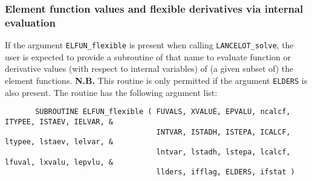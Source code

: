 \documentclass{galahad}
\newcommand{\fullpackagename}{LANC\-E\-LOT}
\newcommand{\solver}{{\tt \fullpackagename\_solve}}
\begin{document}

\subsubsection{Element function values and flexible derivatives via internal evaluation\label{efvf}}

If the argument {\tt ELFUN\_flexible} is present when calling \solver, the
user is expected to provide a subroutine of that name to evaluate
function or derivative values (with respect to internal variables)
of (a given subset of) the element functions.
{\bf N.B.} This routine is only permitted if the argument {\tt ELDERS}
is also present.
The routine has the following argument list:

\def\baselinestretch{0.8}
{\tt \begin{verbatim}
       SUBROUTINE ELFUN_flexible ( FUVALS, XVALUE, EPVALU, ncalcf, ITYPEE, ISTAEV, IELVAR, &
                                   INTVAR, ISTADH, ISTEPA, ICALCF, ltypee, lstaev, lelvar, &
                                   lntvar, lstadh, lstepa, lcalcf, lfuval, lxvalu, lepvlu, &
                                   llders, ifflag, ELDERS, ifstat )
\end{verbatim} }
\def\baselinestretch{1.0}
\end{document}
